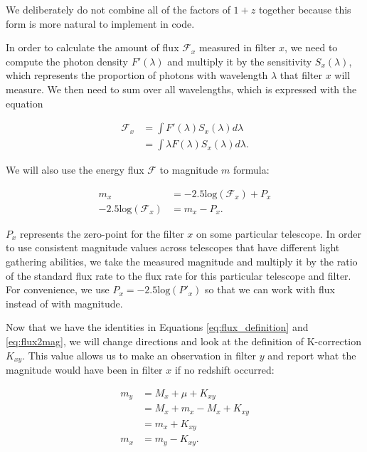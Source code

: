 \documentclass[linenumbers]{aastex631}
\begin{document}
\noindent We deliberately do not combine all of the factors of $1+z$ together because
this form is more natural to implement in code.

In order to calculate the amount of flux $\mathcal{F}_x$ measured in filter
$x$, we need to compute the photon density $F'(\lambda)$ and multiply it by
the sensitivity $S_x(\lambda)$, which represents the proportion of photons with
wavelength $\lambda$ that filter $x$ will measure. We then need to sum over
all wavelengths, which is expressed with the equation

\begin{equation}
\begin{aligned}
\label{eq:flux_definition}
  \mathcal{F}_x &= \int F'(\lambda) S_x(\lambda) d\lambda \\
                &= \int \lambda F(\lambda) S_x(\lambda) d\lambda.
\end{aligned}
\end{equation}

We will also use the energy flux $\mathcal{F}$ to magnitude $m$ formula:

\begin{equation}
\begin{aligned}
\label{eq:flux2mag}
                             m_x &= -2.5 \text{log}(\mathcal{F}_x) + P_x \\
  -2.5 \text{log}(\mathcal{F}_x) &= m_x - P_x .
\end{aligned}
\end{equation}

\noindent $P_x$ represents the zero-point for the filter $x$ on some particular
telescope. In order to use consistent magnitude values across telescopes that
have different light gathering abilities, we take the measured magnitude and
multiply it by the ratio of the standard flux rate to the flux rate for this
particular telescope and filter. For convenience, we use $P_x = -2.5
\text{log}(P'_x)$ so that we can work with flux instead of with magnitude.

Now that we have the identities in Equations \ref{eq:flux_definition} and
\ref{eq:flux2mag}, we will change directions and look at the definition of
K-correction $K_{xy}$. This value allows us to make an observation in filter
$y$ and report what the magnitude would have been in filter $x$ if no redshift
occurred:

\begin{equation}
\begin{aligned}
\label{eq:definition}
  m_y &= M_x + \mu + K_{xy} \\
      &= M_x + m_x - M_x + K_{xy} \\
      &= m_x + K_{xy} \\
  m_x &= m_y - K_{xy} .
\end{aligned}
\end{equation}
\end{document}
